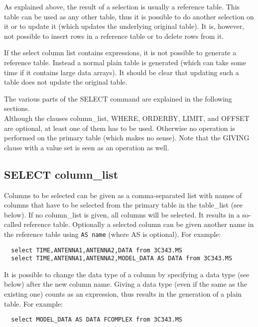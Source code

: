 As explained above, the result of a selection is usually a reference
table. This table can be used as any other table, thus it is possible
to do another selection on it or to update it (which updates the
underlying original table). It is, however, not possible to insert
rows in a reference table or to delete rows from it.

If the select column list contains expressions, it is not possible to
generate a reference table. Instead a normal plain table is generated
(which can take some time if it contains large data arrays).
It should be clear that updating such a table does not update the
original table.

The various parts of the SELECT command are explained in the following
sections.
\\Although the clauses column\_list, WHERE, ORDERBY, LIMIT, and OFFSET
are optional,
at least one of them has to be used. Otherwise no operation is
performed on the primary table (which makes no sense).
Note that the GIVING clause with a value set is seen as an operation
as well.

\subsection{\label{TAQL:COLUMNLIST}SELECT column\_list}
Columns to be selected can be given as
a comma-separated list with names of columns that have to be
selected from the primary table in the table\_list (see below).
If no column\_list is given, all columns will be selected.
It results in a so-called reference table. Optionally a
selected column can be given another name in the reference
table using \texttt{AS name} (where AS is optional).
For example:
\begin{verbatim}
  select TIME,ANTENNA1,ANTENNA2,DATA from 3C343.MS
  select TIME,ANTENNA1,ANTENNA2,MODEL_DATA AS DATA from 3C343.MS
\end{verbatim}
It is possible to change the data type of a column by specifying a
data type (see below) after the new column name. Giving a data type
(even if the same as the existing one) counts as an expression,
thus results in the generation of a plain table.
For example:
\begin{verbatim}
  select MODEL_DATA AS DATA FCOMPLEX from 3C343.MS
\end{verbatim}

